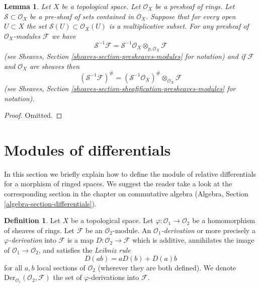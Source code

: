 \documentclass{stacks-project}
\theoremstyle{plain}
\newtheorem{lemma}[subsection]{Lemma}
\theoremstyle{definition}
\newtheorem{definition}[subsection]{Definition}
\theoremstyle{remark}
\numberwithin{equation}{subsection}
\begin{document}
\begin{lemma}
\label{lemma-simple-invert-module}
Let $X$ be a topological space.
Let $\mathcal{O}_X$ be a presheaf of rings.
Let $\mathcal{S} \subset \mathcal{O}_X$ be a pre-sheaf of sets contained
in $\mathcal{O}_X$. Suppose that for every open $U \subset X$ the set
$\mathcal{S}(U) \subset \mathcal{O}_X(U)$ is a multiplicative subset.
For any presheaf of $\mathcal{O}_X$-modules $\mathcal{F}$ we
have
$$
\mathcal{S}^{-1}\mathcal{F}
=
\mathcal{S}^{-1}\mathcal{O}_X \otimes_{p, \mathcal{O}_X} \mathcal{F}
$$
(see Sheaves, Section \ref{sheaves-section-presheaves-modules} for notation)
and if $\mathcal{F}$ and $\mathcal{O}_X$ are sheaves then
$$
(\mathcal{S}^{-1}\mathcal{F})^\#
=
(\mathcal{S}^{-1}\mathcal{O}_X)^\# \otimes_{\mathcal{O}_X} \mathcal{F}
$$
(see Sheaves, Section \ref{sheaves-section-sheafification-presheaves-modules}
for notation).
\end{lemma}

\begin{proof}
Omitted.
\end{proof}








\section{Modules of differentials}
\label{section-differentials}

\noindent
In this section we briefly explain how to define the module of relative
differentials for a morphism of ringed spaces. We suggest the reader take
a look at the corresponding section in the chapter on commutative algebra
(Algebra, Section \ref{algebra-section-differentials}).

\begin{definition}
\label{definition-derivation}
Let $X$ be a topological space. Let $\varphi : \mathcal{O}_1 \to \mathcal{O}_2$
be a homomorphism of sheaves of rings. Let $\mathcal{F}$ be an
$\mathcal{O}_2$-module. An {\it $\mathcal{O}_1$-derivation} or more precisely
a {\it $\varphi$-derivation} into $\mathcal{F}$ is a map
$D : \mathcal{O}_2 \to \mathcal{F}$ which is additive, annihilates the image
of $\mathcal{O}_1 \to \mathcal{O}_2$, and satisfies the
{\it Leibniz rule}
$$
D(ab) = aD(b) + D(a)b
$$
for all $a, b$ local sections of $\mathcal{O}_2$ (wherever they are both
defined). We denote $\text{Der}_{\mathcal{O}_1}(\mathcal{O}_2, \mathcal{F})$
the set of $\varphi$-derivations into $\mathcal{F}$.
\end{definition}
\end{document}
